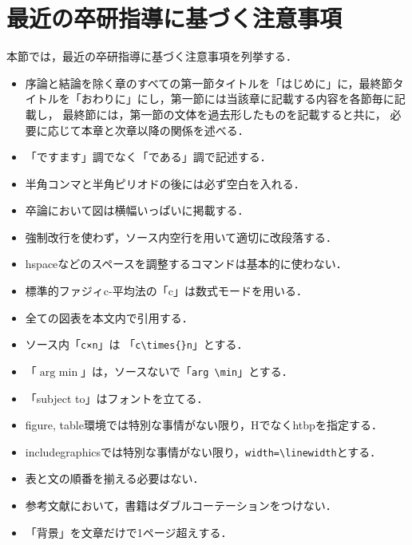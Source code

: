 \documentclass[a4j,12pt,dvipdfmx,oneside]{jsbook}
\makeatletter
\theoremstyle{definition}
\def\minimize{\mathop{\operator@font minimize}}
\makeatother
\begin{document}
\section{最近の卒研指導に基づく注意事項}
\label{sec:latex-rule-recent}
本節では，最近の卒研指導に基づく注意事項を列挙する．
\begin{itemize}
\item 序論と結論を除く章のすべての第一節タイトルを「はじめに」に，最終節タイトルを「おわりに」にし，第一節には当該章に記載する内容を各節毎に記載し，
最終節には，第一節の文体を過去形したものを記載すると共に，
必要に応じて本章と次章以降の関係を述べる．
\item 「ですます」調でなく「である」調で記述する．
\item 半角コンマと半角ピリオドの後には必ず空白を入れる．
\item 卒論において図は横幅いっぱいに掲載する．
\item 強制改行を使わず，ソース内空行を用いて適切に改段落する．
\item \textsf{hspace}などのスペースを調整するコマンドは基本的に使わない．
\item 標準的ファジィc-平均法の「c」は数式モードを用いる．
\item 全ての図表を本文内で引用する．
\item ソース内「\texttt{c×n}」は
「\texttt{c\textbackslash{}times\{\}n}」とする．
\item 「$\text{arg }\min$」は，ソースないで「\texttt{arg \textbackslash{}min}」とする．
\item 「subject to」はフォントを立てる．
\item figure, table環境では特別な事情がない限り，Hでなくhtbpを指定する．
\item includegraphicsでは特別な事情がない限り，\texttt{width=\textbackslash{}linewidth}とする．
\item 表と文の順番を揃える必要はない．
\item 参考文献において，書籍はダブルコーテーションをつけない．
\item 「背景」を文章だけで1ページ超えする．

\end{itemize}
\end{document}
